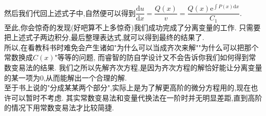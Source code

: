 \documentclass[a4paper,oneside]{ctexart}
\newcommand{\e}{\mathrm{e}}
\newcommand{\di}{\mathrm{d}}
\begin{document}
然后我们代回上述式子中,自然便可以得到$\dfrac{\di u}{\di x}=\dfrac{Q(x)}{v}=\dfrac{Q(x)\e^{\int{P(x)\di x}}}{C_1}$.\\
至此,你会惊奇的发现(好吧算不上多惊奇)我们成功完成了分离变量的工作.
只需要把上述式子两边积分,最后整理表达式,就可以得到最终的结果了.\\
所以,在看教科书时难免会产生诸如"为什么可以当成齐次来解""为什么可以把那个常数换成$C(x)$"等等的问题,
而睿智的防自学设计又不会告诉你我们如何得到常数变易法的结果.
我们之所以先解齐次方程,是因为齐次方程的解恰好能让分离变量的某一项为0,从而能解出一个合理的解.\\
至于书上说的"分成某某两个部分",实际上是为了解更高阶的微分方程用的,现在也许可以暂时不考虑.
其实常数变易法和变量代换法在一阶时并无明显差距,直到高阶的情况下用常数变易法才比较简捷.
\end{document}
